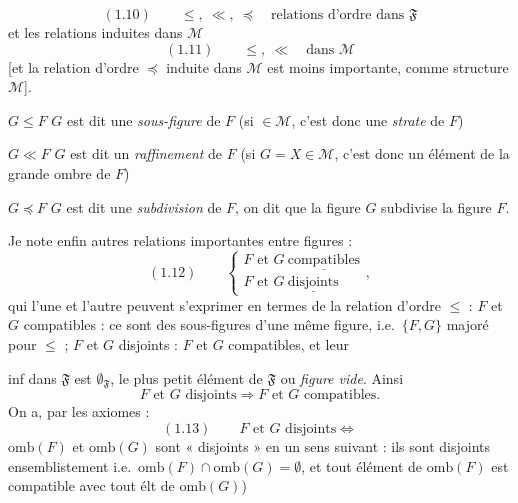 \documentclass[11pt,a4paper]{article}
\begin{document}
\[
  (1.10) \qquad \leq,\ \ll,\ \preccurlyeq \quad \text{relations d'ordre dans } \mathfrak{F}
\]
et les relations induites dans $\mathcal{M}$
\[
  (1.11) \qquad \leq,\ \ll \quad \text{dans } \mathcal{M}
\]
[et la relation d'ordre $\preccurlyeq$ induite dans $\mathcal{M}$ est moins importante, comme structure  \ill{} $\mathcal{M}$].


$G \leq F$ \quad $G$ est dit une \emph{sous-figure} de $F$ (si   $\in \mathcal{M}$, c'est donc une \emph{strate} de $F$)

$G \ll F$ \quad $G$ est dit un \emph{raffinement} de $F$ (si $G = X \in \mathcal{M}$, c'est donc un élément de la grande ombre de $F$)

$G \preccurlyeq F$ \quad $G$ est dit une \emph{subdivision} de $F$, on dit que la figure $G$ subdivise la figure $F$.

Je note enfin  autres relations importantes  entre figures :
\[
  (1.12) \qquad
  \begin{cases}
    F \text{ et } G \ \underline{\text{compatibles}} \\
    F \text{ et } G \ \underline{\text{disjoints}}
  \end{cases} ,
\]
qui l'une et l'autre peuvent s'exprimer en termes de la relation d'ordre $\leq$ :
$F$ et $G$ compatibles : ce sont des sous-figures d'une même figure, i.e.\ $\lbrace F, G \rbrace$ majoré pour $\leq$ ;
$F$ et $G$ disjoints : $F$ et $G$ compatibles, et leur

inf dans $\mathfrak{F}$ est $\emptyset_{\mathfrak{F}}$, le plus petit élément de $\mathfrak{F}$ ou \emph{figure vide}. Ainsi
\[
  F \text{ et } G \text{ disjoints} \Longrightarrow F \text{ et } G \text{ compatibles.}
\]
On a, par les axiomes :
\[
  (1.13) \qquad F \text{ et } G \text{ disjoints} \iff
\]
 $\mathrm{omb}(F)$ et $\mathrm{omb}(G)$  sont « disjoints » en un sens suivant : ils sont disjoints ensemblistement i.e.\ $\mathrm{omb}(F) \cap \mathrm{omb}(G) = \emptyset$, et tout élément de $\mathrm{omb}(F)$ est compatible avec tout élt de $\mathrm{omb}(G)$)
\end{document}
